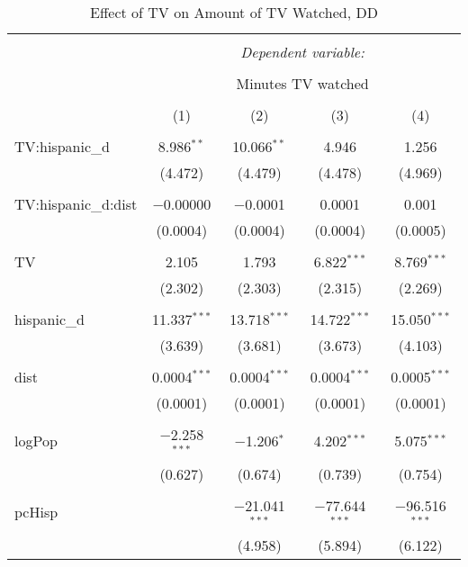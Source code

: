 
\begin{table}[!htbp] \centering 
  \caption{Effect of TV on Amount of TV Watched, DD} 
  \label{} 
\begin{tabular}{@{\extracolsep{-5pt}}lcccc} 
\\[-1.8ex]\hline 
\hline \\[-1.8ex] 
 & \multicolumn{4}{c}{\textit{Dependent variable:}} \\ 
\cline{2-5} 
\\[-1.8ex] & \multicolumn{4}{c}{Minutes TV watched} \\ 
\\[-1.8ex] & (1) & (2) & (3) & (4)\\ 
\hline \\[-1.8ex] 
 TV:hispanic\_d & 8.986$^{**}$ & 10.066$^{**}$ & 4.946 & 1.256 \\ 
  & (4.472) & (4.479) & (4.478) & (4.969) \\ 
  & & & & \\ 
 TV:hispanic\_d:dist & $-$0.00000 & $-$0.0001 & 0.0001 & 0.001 \\ 
  & (0.0004) & (0.0004) & (0.0004) & (0.0005) \\ 
  & & & & \\ 
 TV & 2.105 & 1.793 & 6.822$^{***}$ & 8.769$^{***}$ \\ 
  & (2.302) & (2.303) & (2.315) & (2.269) \\ 
  & & & & \\ 
 hispanic\_d & 11.337$^{***}$ & 13.718$^{***}$ & 14.722$^{***}$ & 15.050$^{***}$ \\ 
  & (3.639) & (3.681) & (3.673) & (4.103) \\ 
  & & & & \\ 
 dist & 0.0004$^{***}$ & 0.0004$^{***}$ & 0.0004$^{***}$ & 0.0005$^{***}$ \\ 
  & (0.0001) & (0.0001) & (0.0001) & (0.0001) \\ 
  & & & & \\ 
 logPop & $-$2.258$^{***}$ & $-$1.206$^{*}$ & 4.202$^{***}$ & 5.075$^{***}$ \\ 
  & (0.627) & (0.674) & (0.739) & (0.754) \\ 
  & & & & \\ 
 pcHisp &  & $-$21.041$^{***}$ & $-$77.644$^{***}$ & $-$96.516$^{***}$ \\ 
  &  & (4.958) & (5.894) & (6.122) \\ 

\end{tabular}
\end{table}
